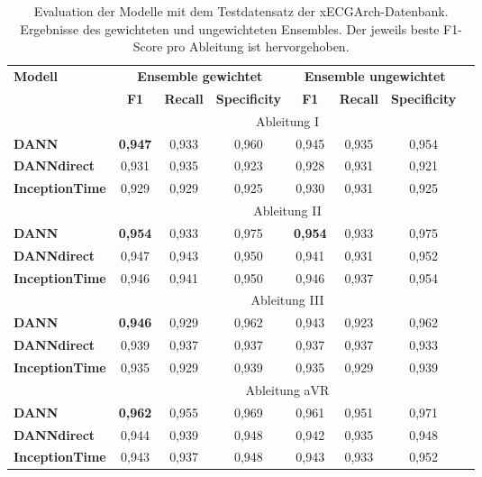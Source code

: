 \begin{table}[h!]
\centering
\caption[Ergebnisse der Evaluation auf der Quelldomäne xECGArch pro Ableitung]{Evaluation der Modelle mit dem Testdatensatz der xECGArch-Datenbank. Ergebnisse des gewichteten und ungewichteten Ensembles. Der jeweils beste F1-Score pro Ableitung ist hervorgehoben. }
\label{tab:Ergebnisse_indomain_leads}
\begin{tabular}{lccccccc}
\toprule
\textbf{Modell}     & \multicolumn{3}{c}{\textbf{Ensemble gewichtet}} & \multicolumn{3}{c}{\textbf{Ensemble ungewichtet}}\\
						& \textbf{F1} & \textbf{Recall} & \textbf{Specificity} & \textbf{F1} & \textbf{Recall} & \textbf{Specificity}\\  
\midrule
					   & \multicolumn{6}{c}{{Ableitung I}} \\ 
\cmidrule(lr){2-7}
\textbf{DANN} 			& \textbf{0,947}  & 0,933  & 0,960 & 0,945 & 0,935 & 0,954 \\
\textbf{DANNdirect}     & 0,931  & 0,935  & 0,923 & 0,928 & 0,931 & 0,921 \\
\textbf{InceptionTime}  & 0,929  & 0,929  & 0,925 & 0,930 & 0,931 & 0,925 \\
\midrule
					   & \multicolumn{6}{c}{{Ableitung II}} \\ 
\cmidrule(lr){2-7}
\textbf{DANN} 			& \textbf{0,954}  & 0,933  & 0,975 & \textbf{0,954} & 0,933 & 0,975 \\
\textbf{DANNdirect}     & 0,947  & 0,943  & 0,950 & 0,941 & 0,931 & 0,952 \\
\textbf{InceptionTime}  & 0,946  & 0,941  & 0,950 & 0,946 & 0,937 & 0,954 \\
\midrule
					   & \multicolumn{6}{c}{{ Ableitung III}} \\ 
\cmidrule(lr){2-7}
\textbf{DANN} 			& \textbf{0,946}  & 0,929  & 0,962 & 0,943 & 0,923 & 0,962 \\
\textbf{DANNdirect}     & 0,939  & 0,937  & 0,937 & 0,937 & 0,937 & 0,933 \\
\textbf{InceptionTime}  & 0,935  & 0,929  & 0,939 & 0,935 & 0,929 & 0,939 \\
\midrule
					   & \multicolumn{6}{c}{{ Ableitung aVR}} \\ 
\cmidrule(lr){2-7}
\textbf{DANN} 			& \textbf{0,962}  & 0,955  & 0,969 & 0,961 & 0,951 & 0,971 \\
\textbf{DANNdirect}     & 0,944  & 0,939  & 0,948 & 0,942 & 0,935 & 0,948 \\
\textbf{InceptionTime}  & 0,943  & 0,937  & 0,948 & 0,943 & 0,933 & 0,952 \\

\end{tabular}
\end{table}
